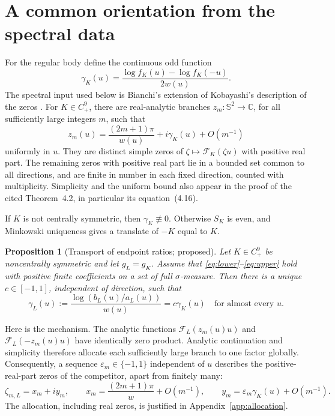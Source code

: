 \documentclass[11pt,a4paper]{article}
\newtheorem{proposition}[theorem]{Proposition}
\theoremstyle{definition}
\theoremstyle{remark}
\newcommand{\C}{\mathbb C}
\newcommand{\Sph}{\mathbb S^2}
\newcommand{\F}{\mathcal F}
\numberwithin{equation}{section}
\begin{document}
\section{A common orientation from the spectral data}\label{sec:spectral}
For the regular body define the continuous odd function
\begin{equation}\label{eq:gammaK}
 \gamma_K(u)=\frac{\log f_K(u)-\log f_K(-u)}{2w(u)} .
\end{equation}
The spectral input used below is Bianchi's extension of Kobayashi's
description of the zeros \cite[Theorems~4.1--4.2]{Bianchi2016}.
For $K\in C^9_+$, there are real-analytic branches
$z_m:\Sph\to\C$, for all sufficiently large integers $m$, such that
\begin{equation}\label{eq:rootsK}
 z_m(u)=\frac{(2m+1)\pi}{w(u)}+i\gamma_K(u)+O(m^{-1})
\end{equation}
uniformly in $u$. They are distinct simple zeros of
$\zeta\mapsto\F_K(\zeta u)$ with positive real part.
The remaining zeros with positive real part lie in a bounded set common
to all directions, and are finite in number in each fixed direction,
counted with multiplicity. Simplicity and the uniform bound also appear
in the proof of the cited Theorem~4.2, in particular its equation~(4.16).

If $K$ is not centrally symmetric, then $\gamma_K\not\equiv0$.
Otherwise $S_K$ is even, and Minkowski uniqueness gives a translate of
$-K$ equal to $K$.

\begin{proposition}[Transport of endpoint ratios; proposed]\label{prop:transport}
Let $K\in C^9_+$ be noncentrally symmetric and let $g_L=g_K$.
Assume that \eqref{eq:lower}--\eqref{eq:upper} hold with positive
finite coefficients on a set of full $\sigma$-measure.
Then there is a unique $c\in[-1,1]$, independent of direction, such that
\begin{equation}\label{eq:transport}
 \gamma_L(u):=\frac{\log(b_L(u)/a_L(u))}{w(u)}
             =c\gamma_K(u)\quad\text{for almost every }u.
\end{equation}
\end{proposition}

Here is the mechanism. The analytic functions
$\F_L(z_m(u)u)$ and $\F_L(-z_m(u)u)$ have identically zero product.
Analytic continuation and simplicity therefore allocate each sufficiently
large branch to one factor globally. Consequently, a sequence
$\varepsilon_m\in\{-1,1\}$ independent of $u$ describes the positive-real-part
zeros of the competitor, apart from finitely many:
\begin{equation}\label{eq:rootsL}
 \zeta_{m,L}=x_m+iy_m,\qquad
 x_m=\frac{(2m+1)\pi}{w}+O(m^{-1}),\qquad
 y_m=\varepsilon_m\gamma_K(u)+O(m^{-1}).
\end{equation}
The allocation, including real zeros, is justified in Appendix~\ref{app:allocation}.
\end{document}
